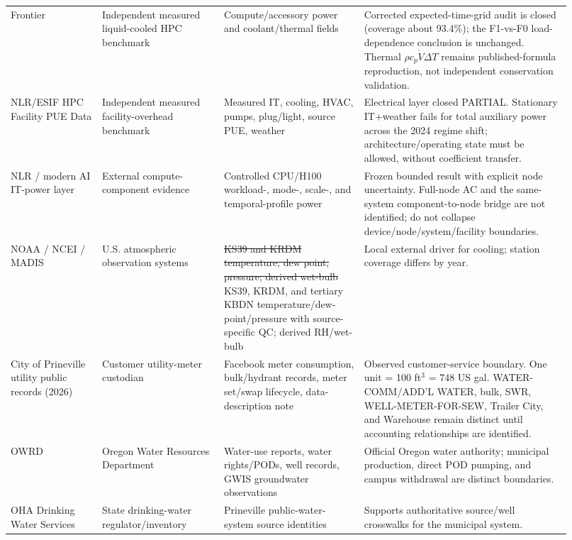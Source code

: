 \documentclass[11pt]{article}
\newcommand{\oldtxt}[1]{\textcolor{blue!70!black}{\sout{#1}}}
\newcommand{\latesttxt}[1]{\textcolor{purple!85!black}{#1}}
\begin{document}
\begin{longtable}{@{}p{0.15\linewidth}p{0.20\linewidth}p{0.23\linewidth}p{0.34\linewidth}@{}}
\latesttxt{Frontier \cite{frontier2024}} & \latesttxt{Independent measured liquid-cooled HPC benchmark} & \latesttxt{Compute/accessory power and coolant/thermal fields} & \latesttxt{Corrected expected-time-grid audit is closed (coverage about 93.4\%); the F1-vs-F0 load-dependence conclusion is unchanged. Thermal \(\rho c_p\dot V\Delta T\) remains published-formula reproduction, not independent conservation validation.} \\
\latesttxt{NLR/ESIF HPC Facility PUE Data \cite{esifdata}} & \latesttxt{Independent measured facility-overhead benchmark} & \latesttxt{Measured IT, cooling, HVAC, pumps, plug/light, source PUE, weather} & \latesttxt{Electrical layer closed PARTIAL. Stationary IT+weather fails for total auxiliary power across the 2024 regime shift; architecture/operating state must be allowed, without coefficient transfer.} \\
\latesttxt{NLR / modern AI IT-power layer} & \latesttxt{External compute-component evidence} & \latesttxt{Controlled CPU/H100 workload-, mode-, scale-, and temporal-profile power} & \latesttxt{Frozen bounded result with explicit node uncertainty. Full-node AC and the same-system component-to-node bridge are not identified; do not collapse device/node/system/facility boundaries.} \\
NOAA / NCEI / MADIS & U.S. atmospheric observation systems & \oldtxt{KS39 and KRDM temperature, dew point, pressure; derived wet-bulb} \latesttxt{KS39, KRDM, and tertiary KBDN temperature/dew-point/pressure with source-specific QC; derived RH/wet-bulb} & Local external driver for cooling; station coverage differs by year. \\
\latesttxt{City of Prineville utility public records (2026)} & \latesttxt{Customer utility-meter custodian} & \latesttxt{Facebook meter consumption, bulk/hydrant records, meter set/swap lifecycle, data-description note} & \latesttxt{Observed customer-service boundary. One unit = 100 ft\(^3\) = 748 US gal. WATER-COMM/ADD'L WATER, bulk, SWR, WELL-METER-FOR-SEW, Trailer City, and Warehouse remain distinct until accounting relationships are identified.} \\
OWRD & Oregon Water Resources Department & Water-use reports, water rights/PODs, well records, GWIS groundwater observations & Official Oregon water authority; municipal production, direct POD pumping, and campus withdrawal are distinct boundaries. \\
OHA Drinking Water Services & State drinking-water regulator/inventory & Prineville public-water-system source identities & Supports authoritative source/well crosswalks for the municipal system. \\

\end{longtable}
\end{document}
